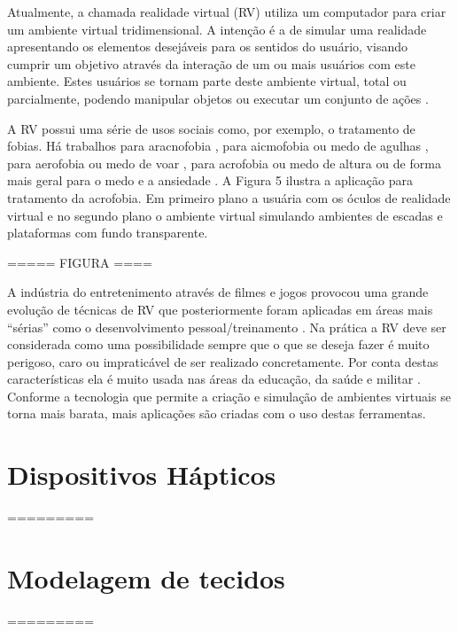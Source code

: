 Atualmente, a chamada realidade virtual (RV) utiliza um computador para criar um ambiente virtual tridimensional. A intenção é a de simular uma realidade apresentando os elementos desejáveis para os sentidos do usuário, visando cumprir um objetivo através da interação de um ou mais usuários com este ambiente. Estes usuários se tornam parte deste ambiente virtual, total ou parcialmente, podendo manipular objetos ou executar um conjunto de ações \cite{VRS2018}.

A RV possui uma série de usos sociais como, por exemplo, o tratamento de fobias. Há trabalhos para aracnofobia \cite{Carlin1997}, para aicmofobia ou medo de agulhas \cite{Galoustian2018}, para aerofobia ou medo de voar \cite{Rothbaum2006}, para acrofobia ou medo de altura \cite{Edwards2018} ou de forma mais geral para o medo e a ansiedade \cite{Goldman2017}. A Figura 5 ilustra a aplicação para tratamento da acrofobia. Em primeiro plano a usuária com os óculos de realidade virtual e no segundo plano o ambiente virtual simulando ambientes de escadas e plataformas com fundo transparente.

===== FIGURA ====

A indústria do entretenimento através de filmes e jogos provocou uma grande evolução de técnicas de RV que posteriormente foram aplicadas em áreas mais “sérias” como o desenvolvimento pessoal/treinamento \cite{Ma2011, Prensky2001, Smith2011}. Na prática a RV deve ser considerada como uma possibilidade sempre que o que se deseja fazer é muito perigoso, caro ou impraticável de ser realizado concretamente. Por conta destas características ela é muito usada nas áreas da educação, da saúde e militar \cite{VRS2018}. Conforme a tecnologia que permite a criação e simulação de ambientes virtuais se torna mais barata, mais aplicações são criadas com o uso destas ferramentas.

\section{Dispositivos Hápticos}

=========

\section{Modelagem de tecidos}

=========

